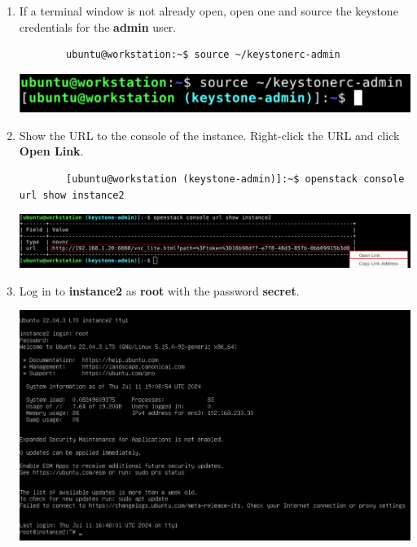 \documentclass[letterpaper, 12pt]{article}
\begin{document}
\begin{enumerate}
    \item If a terminal window is not already open, open one and source the keystone credentials for the \textbf{admin}
    user.
    \begin{lstlisting}
        ubuntu@workstation:~$ source ~/keystonerc-admin
    \end{lstlisting}

    \begin{center}
        \includegraphics[width=\linewidth]{images/part4/step1.png}
    \end{center}

    \item Show the URL to the console of the instance. Right-click the URL and click \textbf{Open Link}.
    \begin{lstlisting}
        [ubuntu@workstation (keystone-admin)]:~$ openstack console url show instance2
    \end{lstlisting}

    \begin{center}
        \includegraphics[width=\linewidth]{images/part4/step2.png}
    \end{center}

    \item Log in to \textbf{instance2} as \textbf{root} with the password \textbf{secret}.
    
    \begin{center}
        \includegraphics[width=\linewidth]{images/part4/step3.png}
    \end{center}


\end{enumerate}
\end{document}
